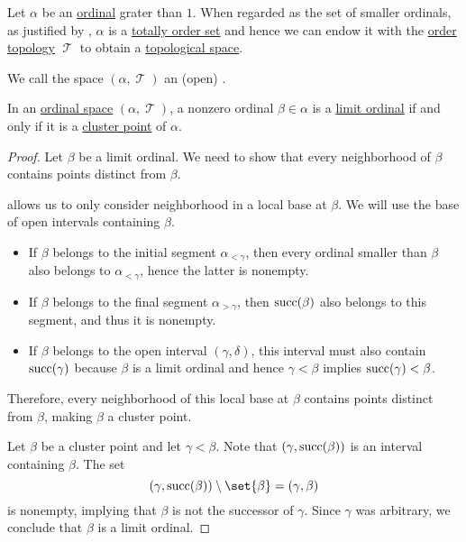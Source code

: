 \begin{definition}\label{def:ordinal_space}
  Let \( \alpha \) be an \hyperref[def:ordinal]{ordinal} grater than \( 1 \). When regarded as the set of smaller ordinals, as justified by , \( \alpha \) is a \hyperref[def:totally_ordered_set]{totally order set} and hence we can endow it with the \hyperref[def:order_topology]{order topology} \( \mscrT \) to obtain a \hyperref[def:topological_space]{topological space}.

  We call the space \( (\alpha, \mscrT) \) an (open) .
\end{definition}

\begin{proposition}\label{thm:limit_ordinal_order_topology}
  In an \hyperref[def:ordinal_space]{ordinal space} \( (\alpha, \mscrT) \), a nonzero ordinal \( \beta \in \alpha \) is a \hyperref[def:successor_and_limit_ordinal]{limit ordinal} if and only if it is a \hyperref[def:set_cluster_point]{cluster point} of \( \alpha \).
\end{proposition}
\begin{proof}
  \SufficiencySubProof Let \( \beta \) be a limit ordinal. We need to show that every neighborhood of \( \beta \) contains points distinct from \( \beta \).

   allows us to only consider neighborhood in a local base at \( \beta \). We will use the base of open intervals containing \( \beta \).
  \begin{itemize}
    \item If \( \beta \) belongs to the initial segment \( \alpha_{<\gamma} \), then every ordinal smaller than \( \beta \) also belongs to \( \alpha_{<\gamma} \), hence the latter is nonempty.

    \item If \( \beta \) belongs to the final segment \( \alpha_{>\gamma} \), then \( \operatorname{succ}(\beta) \) also belongs to this segment, and thus it is nonempty.

    \item If \( \beta \) belongs to the open interval \( (\gamma, \delta) \), this interval must also contain \( \operatorname{succ}(\gamma) \) because \( \beta \) is a limit ordinal and hence \( \gamma < \beta \) implies \( \operatorname{succ}(\gamma) < \beta \).
  \end{itemize}

  Therefore, every neighborhood of this local base at \( \beta \) contains points distinct from \( \beta \), making \( \beta \) a cluster point.

  \NecessitySubProof Let \( \beta \) be a cluster point and let \( \gamma < \beta \). Note that \( (\gamma, \operatorname{succ}(\beta)) \) is an interval containing \( \beta \). The set
  \begin{equation*}
    (\gamma, \op{succ}(\beta)) \setminus \set{ \beta }
    =
    (\gamma, \beta)
  \end{equation*}
  is nonempty, implying that \( \beta \) is not the successor of \( \gamma \). Since \( \gamma \) was arbitrary, we conclude that \( \beta \) is a limit ordinal.
\end{proof}

